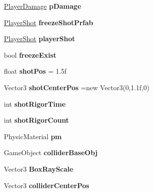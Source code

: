 \begin{DoxyCompactItemize}
\hyperlink{class_player_damage}{Player\+Damage} {\bfseries p\+Damage}
\item 
\mbox{\label{class_player_a6e235568aa19c9fd4e5fa3401a034012}} 
\hyperlink{class_player_shot}{Player\+Shot} {\bfseries freeze\+Shot\+Prfab}
\item 
\mbox{\label{class_player_aa1ee840f2a2922d1b8818f99f8e5bdde}} 
\hyperlink{class_player_shot}{Player\+Shot} {\bfseries player\+Shot}
\item 
\mbox{\label{class_player_afbe42f0dc3a0da4e074ab5df1a603b05}} 
bool {\bfseries freeze\+Exist}
\item 
\mbox{\label{class_player_a17ca3fa8e5d178b6029bb61f5375fcfa}} 
float {\bfseries shot\+Pos} = 1.\+5f
\item 
\mbox{\label{class_player_aee2f0b99b459d2c0ed9748d6e9dd18a4}} 
Vector3 {\bfseries shot\+Center\+Pos} =new Vector3(0,1.\+1f,0)
\item 
\mbox{\label{class_player_a48399463d7559ca444b49794616abab2}} 
int {\bfseries shot\+Rigor\+Time}
\item 
\mbox{\label{class_player_a0f75a822c5ce68bdc7fd4a29f927da34}} 
int {\bfseries shot\+Rigor\+Count}
\item 
\mbox{\label{class_player_a0d7b36217f2284e084754dce7ece4811}} 
Physic\+Material {\bfseries pm}
\item 
\mbox{\label{class_player_a4f097419d4171e0b1381c48ee5e3353c}} 
Game\+Object {\bfseries collider\+Base\+Obj}
\item 
\mbox{\label{class_player_a60ad6d2b486025a08a228554a54a3474}} 
Vector3 {\bfseries Box\+Ray\+Scale}
\item 
\mbox{\label{class_player_a00f307aec7792c08938b3d49b327c9b1}} 
Vector3 {\bfseries collider\+Center\+Pos}
\item 
\mbox{\label{class_player_a68746528069f1c05046cc0f73077f9b7}} 

\end{DoxyCompactItemize}
